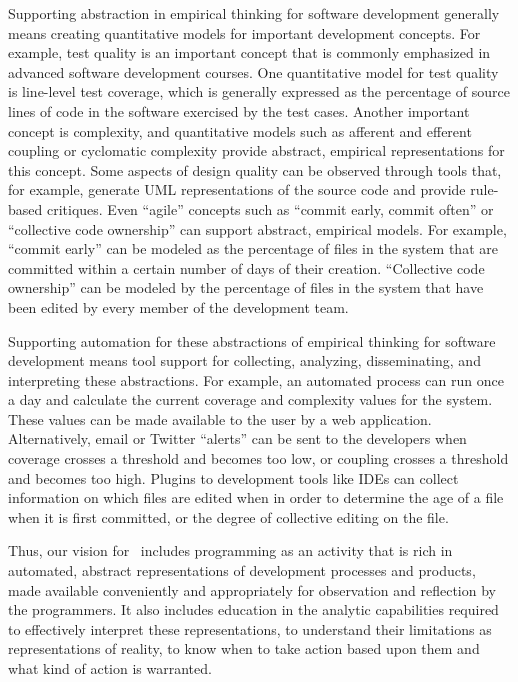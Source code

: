 Supporting abstraction in empirical thinking for software development
generally means creating quantitative models for important development
concepts.  For example, test quality is an important concept that is
commonly emphasized in advanced software development courses.  One
quantitative model for test quality is line-level test coverage, which is
generally expressed as the percentage of source lines of code in the
software exercised by the test cases.  Another important concept is
complexity, and quantitative models such as afferent and efferent coupling
or cyclomatic complexity provide abstract, empirical representations for
this concept. Some aspects of design quality can be observed through tools
that, for example, generate UML representations of the source code and
provide rule-based critiques.  Even ``agile'' concepts such as ``commit
early, commit often'' or ``collective code ownership'' can support
abstract, empirical models. For example, ``commit early'' can be modeled as
the percentage of files in the system that are committed within a certain
number of days of their creation.  ``Collective code ownership'' can be
modeled by the percentage of files in the system that have been edited by
every member of the development team.

Supporting automation for these abstractions of empirical thinking for
software development means tool support for collecting, analyzing,
disseminating, and interpreting these abstractions.  For example, an
automated process can run once a day and calculate the current coverage and
complexity values for the system.  These values can be made available to
the user by a web application. Alternatively, email or Twitter ``alerts''
can be sent to the developers when coverage crosses a threshold and becomes
too low, or coupling crosses a threshold and becomes too high.  Plugins to
development tools like IDEs can collect information on which files are
edited when in order to determine the age of a file when it is first
committed, or the degree of collective editing on the file.

Thus, our vision for \eCT\ includes programming as an activity that is rich
in automated, abstract representations of development processes and
products, made available conveniently and appropriately for observation and
reflection by the programmers.  It also includes education in the analytic
capabilities required to effectively interpret these representations, to
understand their limitations as representations of reality, to know when to
take action based upon them and what kind of action is warranted.

